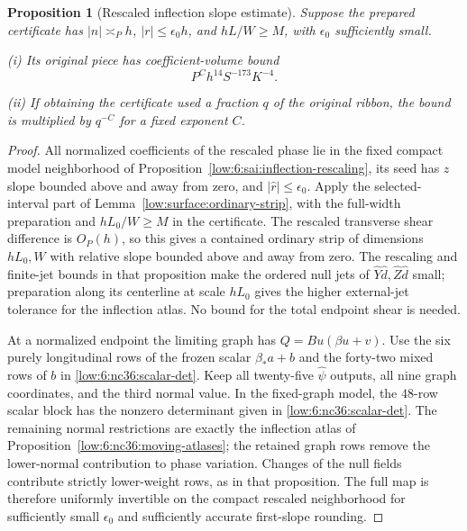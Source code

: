 \documentclass[11pt]{amsart}
\newtheorem{proposition}[theorem]{Proposition}
\theoremstyle{definition}
\theoremstyle{remark}
\numberwithin{equation}{section}
\begin{document}
\begin{proposition}[Rescaled inflection slope estimate]\label{low:6:s36i:slope}
Suppose the prepared certificate has $|n|\asymp_Ph$, $|r|\le\epsilon_0h$, and $hL/W\ge M$, with $\epsilon_0$ sufficiently small.

\noindent\textup{(i)} Its original piece has coefficient-volume bound
\[
P^Ch^{14}S^{-173}K^{-4}.
\]

\noindent\textup{(ii)} If obtaining the certificate used a fraction $q$ of the original ribbon, the bound is multiplied by $q^{-C}$ for a fixed exponent $C$.
\end{proposition}
\begin{proof}
All normalized coefficients of the rescaled phase lie in the fixed compact model neighborhood of Proposition~\ref{low:6:sai:inflection-rescaling}, its seed has $z$ slope bounded above and away from zero, and $|\widehat r|\le\epsilon_0$. Apply the selected-interval part of Lemma~\ref{low:surface:ordinary-strip}, with the full-width preparation and $hL_0/W\ge M$ in the certificate. The rescaled transverse shear difference is $O_P(h)$, so this gives a contained ordinary strip of dimensions $hL_0,W$ with relative slope bounded above and away from zero. The rescaling and finite-jet bounds in that proposition make the ordered null jets of $\widehat Y\widehat d,\widehat Z\widehat d$ small; preparation along its centerline at scale $hL_0$ gives the higher external-jet tolerance for the inflection atlas. No bound for the total endpoint shear is needed.

At a normalized endpoint the limiting graph has $Q=Bu(\beta u+v)$. Use the six purely longitudinal rows of the frozen scalar $\beta_*a+b$ and the forty-two mixed rows of $b$ in \eqref{low:6:nc36:scalar-det}. Keep all twenty-five $\widehat\psi$ outputs, all nine graph coordinates, and the third normal value. In the fixed-graph model, the $48$-row scalar block has the nonzero determinant given in \eqref{low:6:nc36:scalar-det}. The remaining normal restrictions are exactly the inflection atlas of Proposition~\ref{low:6:nc36:moving-atlases}; the retained graph rows remove the lower-normal contribution to phase variation. Changes of the null fields contribute strictly lower-weight rows, as in that proposition. The full map is therefore uniformly invertible on the compact rescaled neighborhood for sufficiently small $\epsilon_0$ and sufficiently accurate first-slope rounding.


\end{proof}
\end{document}
